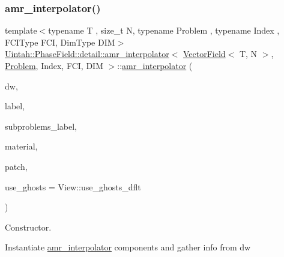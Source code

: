 \subsubsection{\texorpdfstring{amr\+\_\+interpolator()}{amr\_interpolator()}\hspace{0.1cm}{\footnotesize\ttfamily [2/3]}}
{\footnotesize\ttfamily template$<$typename T , size\+\_\+t N, typename Problem , typename Index , F\+C\+I\+Type F\+CI, Dim\+Type D\+IM$>$ \\
\hyperlink{classUintah_1_1PhaseField_1_1detail_1_1amr__interpolator}{Uintah\+::\+Phase\+Field\+::detail\+::amr\+\_\+interpolator}$<$ \hyperlink{structUintah_1_1PhaseField_1_1VectorField}{Vector\+Field}$<$ T, N $>$, \hyperlink{classUintah_1_1PhaseField_1_1Problem}{Problem}, Index, F\+CI, D\+IM $>$\+::\hyperlink{classUintah_1_1PhaseField_1_1detail_1_1amr__interpolator}{amr\+\_\+interpolator} (\begin{DoxyParamCaption}\item[{Data\+Warehouse $\ast$}]{dw,  }\item[{const typename \hyperlink{structUintah_1_1PhaseField_1_1VectorField_a59698346336d8cdfdf767367839f2be9}{Field\+::label\+\_\+type} \&}]{label,  }\item[{const Var\+Label $\ast$}]{subproblems\+\_\+label,  }\item[{int}]{material,  }\item[{const Patch $\ast$}]{patch,  }\item[{bool}]{use\+\_\+ghosts = {\ttfamily View\+:\+:use\+\_\+ghosts\+\_\+dflt} }\end{DoxyParamCaption})\hspace{0.3cm}{\ttfamily [inline]}}



Constructor. 

Instantiate \hyperlink{classUintah_1_1PhaseField_1_1detail_1_1amr__interpolator}{amr\+\_\+interpolator} components and gather info from dw


